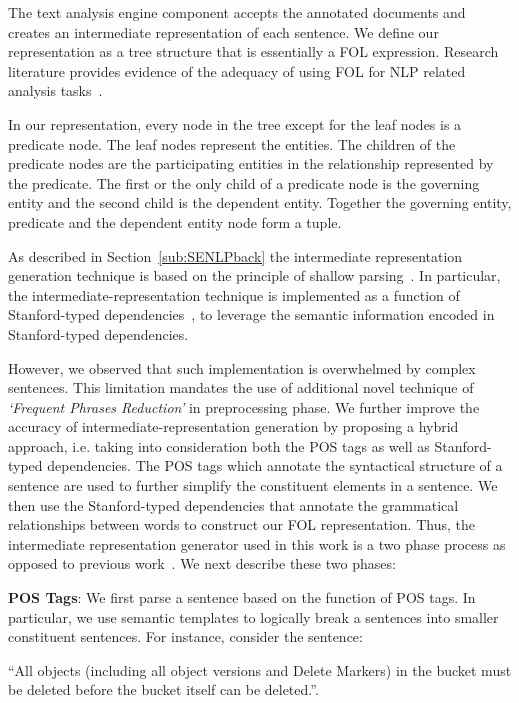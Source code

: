 The text analysis engine component accepts the annotated documents and creates an intermediate representation of each sentence.
We define our representation as a tree structure that is essentially a FOL expression.
Research literature provides evidence of the adequacy of using FOL for NLP related analysis tasks~\cite{Sinha2009,Sinha2010,pandita12:inferring, pandita13:WHYPER}.

In our representation, every node in the tree except for the leaf nodes is a predicate node. 
The leaf nodes represent the entities.
The children of the predicate nodes are the participating entities in the relationship represented by the predicate.
The first or the only child of a predicate node is the governing entity and the second child is the dependent entity.
Together the governing entity, predicate and the dependent entity node form a tuple.  


As described in Section~\ref{sub:SENLPback} the intermediate representation generation technique is based on the principle of shallow parsing~\cite{Branimir2000}. 
In particular, the intermediate-representation technique is implemented as a function of Stanford-typed dependencies~\cite{Marneffe06LREC,Marneffe08COLING,KleinNIPS03}, to leverage the semantic information encoded in Stanford-typed dependencies.


However, we observed that such implementation is overwhelmed by complex sentences.
This limitation mandates the use of additional novel technique of \textit{`Frequent Phrases Reduction'} in preprocessing phase.
We further improve the accuracy of intermediate-representation generation by proposing a hybrid approach, i.e. taking into consideration both the POS tags as well as Stanford-typed dependencies.
The POS tags which annotate the syntactical structure of a sentence are used to further simplify the constituent elements in a sentence. 
We then use the Stanford-typed dependencies that annotate the grammatical relationships between words to construct our FOL representation.
Thus, the intermediate representation generator used in this work is a two phase process as opposed to previous work~\cite{pandita12:inferring, pandita13:WHYPER}. 
We next describe these two phases:

\textbf{POS Tags}: We first parse a sentence based on the function of POS tags. 
In particular, we use semantic templates to logically break a sentences into smaller constituent sentences. 
For instance, consider the sentence:

\begin{center}
\scriptsize``All objects (including all object versions and Delete Markers) in the bucket must be deleted before the bucket itself can be deleted.''. \normalsize
\end{center}


